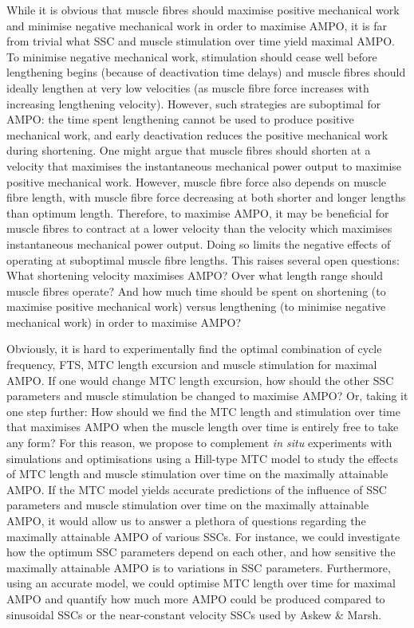 \documentclass[
  10pt,
  letterpaper,
]{article}
\begin{document}
While it is obvious that muscle fibres should maximise positive
mechanical work and minimise negative mechanical work in order to
maximise AMPO, it is far from trivial what SSC and muscle stimulation
over time yield maximal AMPO. To minimise negative mechanical work,
stimulation should cease well before lengthening begins (because of
deactivation time delays) and muscle fibres should ideally lengthen at
very low velocities (as muscle fibre force increases with increasing
lengthening velocity). However, such strategies are suboptimal for AMPO:
the time spent lengthening cannot be used to produce positive mechanical
work, and early deactivation reduces the positive mechanical work during
shortening. One might argue that muscle fibres should shorten at a
velocity that maximises the instantaneous mechanical power output to
maximise positive mechanical work. However, muscle fibre force also
depends on muscle fibre length, with muscle fibre force decreasing at
both shorter and longer lengths than optimum length. Therefore, to
maximise AMPO, it may be beneficial for muscle fibres to contract at a
lower velocity than the velocity which maximises instantaneous
mechanical power output. Doing so limits the negative effects of
operating at suboptimal muscle fibre lengths. This raises several open
questions: What shortening velocity maximises AMPO? Over what length
range should muscle fibres operate? And how much time should be spent on
shortening (to maximise positive mechanical work) versus lengthening (to
minimise negative mechanical work) in order to maximise AMPO?

Obviously, it is hard to experimentally find the optimal combination of
cycle frequency, FTS, MTC length excursion and muscle stimulation for
maximal AMPO. If one would change MTC length excursion, how should the
other SSC parameters and muscle stimulation be changed to maximise AMPO?
Or, taking it one step further: How should we find the MTC length and
stimulation over time that maximises AMPO when the muscle length over
time is entirely free to take any form? For this reason, we propose to
complement \emph{in situ} experiments with simulations and optimisations
using a Hill-type MTC model to study the effects of MTC length and
muscle stimulation over time on the maximally attainable AMPO. If the
MTC model yields accurate predictions of the influence of SSC parameters
and muscle stimulation over time on the maximally attainable AMPO, it
would allow us to answer a plethora of questions regarding the maximally
attainable AMPO of various SSCs. For instance, we could investigate how
the optimum SSC parameters depend on each other, and how sensitive the
maximally attainable AMPO is to variations in SSC parameters.
Furthermore, using an accurate model, we could optimise MTC length over
time for maximal AMPO and quantify how much more AMPO could be produced
compared to sinusoidal SSCs or the near-constant velocity SSCs used by
Askew \& Marsh.
\end{document}
